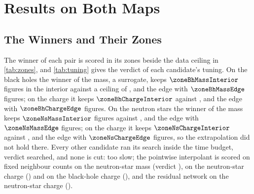 \ifdefined\zoneNsMassInterior\else{}\fi

\section{Results on Both Maps}
\label{sec:results}




\subsection{The Winners and Their Zones}
\label{sec:results-zones}

The winner of each pair is scored in its zones beside the data ceiling in \cref{tab:zones}, and \cref{tab:tuning} gives the verdict of each candidate's tuning. On the black holes the winner of the mass, a \resultsBhMassFamily{} surrogate, keeps $\zoneBhMassInterior$ figures in the interior against a ceiling of \resultsBhMassCeiling{}, and the edge \zoneBhMassMargin{} with $\zoneBhMassEdge$ figures; on the charge it keeps $\zoneBhChargeInterior$ against \resultsBhChargeCeiling{}, and the edge \zoneBhChargeMargin{} with $\zoneBhChargeEdge$ figures. On the neutron stars the winner of the mass keeps $\zoneNsMassInterior$ figures against \resultsNsMassCeiling{}, and the edge \zoneNsMassMargin{} with $\zoneNsMassEdge$ figures; on the charge it keeps $\zoneNsChargeInterior$ against \resultsNsChargeCeiling{}, and the edge \zoneNsChargeMargin{} with $\zoneNsChargeEdge$ figures, so the extrapolation did not hold there. Every other candidate ran its search inside the time budget, verdict searched, and none is cut: too slow; the pointwise interpolant is scored on fixed neighbour counts on the neutron-star mass (verdict \tunNsMassRbfPointwiseVerdict{}), on the neutron-star charge (\tunNsChargeRbfPointwiseVerdict{}) and on the black-hole charge (\tunBhChargeRbfPointwiseVerdict{}), and the residual network on the neutron-star charge (\tunNsChargeResnetPointwiseVerdict{}).

